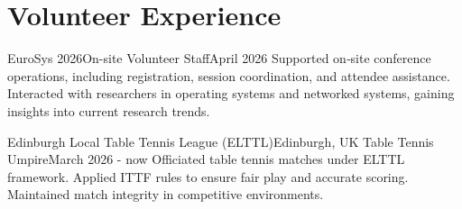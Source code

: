 \section{Volunteer Experience}
  \resumeSubHeadingListStart

    \resumeSubheading
      {EuroSys 2026}{On-site}
      {Volunteer Staff}{April 2026}
      \resumeItemListStart
          {Supported on‑site conference operations, including registration, session coordination, and attendee assistance.}
          {Interacted with researchers in operating systems and networked systems, gaining insights into current research trends.}
      \resumeItemListEnd

    \resumeSubheading
      {Edinburgh Local Table Tennis League (ELTTL)}{Edinburgh, UK}
      {Table Tennis Umpire}{March 2026 - now}
      \resumeItemListStart
          {Officiated table tennis matches under ELTTL framework.}
          {Applied ITTF rules to ensure fair play and accurate scoring.}
          {Maintained match integrity in competitive environments.}
      \resumeItemListEnd

  \resumeSubHeadingListEnd